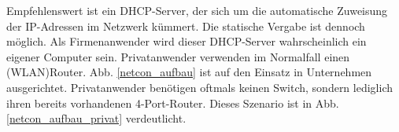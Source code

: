 \documentclass[a4paper,14pt,headsepline]{scrartcl}
\begin{document}
\begin{figure}[h]
\begin{center}
\end{center}
\end{figure}

\newpage

Empfehlenswert ist ein DHCP-Server, der sich um die automatische Zuweisung der IP-Adressen im Netzwerk kümmert. Die statische Vergabe ist dennoch möglich. Als Firmenanwender wird dieser DHCP-Server wahrscheinlich ein eigener Computer sein. Privatanwender verwenden im Normalfall einen \linebreak (WLAN)Router. Abb. \ref{netcon_aufbau} ist auf den Einsatz in Unternehmen ausgerichtet. Privatanwender benötigen oftmals keinen Switch, sondern lediglich ihren bereits vorhandenen 4-Port-Router. Dieses Szenario ist in Abb. \ref{netcon_aufbau_privat} verdeutlicht. 
\end{document}
